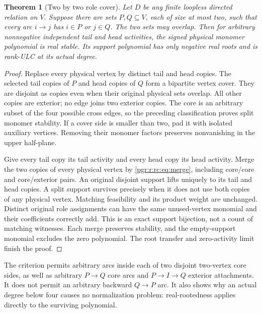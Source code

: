 \documentclass[11pt]{article}
\numberwithin{equation}{section}
\newtheorem{theorem}{Theorem}[section]\newtheorem{lemma}[theorem]{Lemma}\newtheorem{proposition}[theorem]{Proposition}\newtheorem{corollary}[theorem]{Corollary}
\theoremstyle{definition}\newtheorem{definition}[theorem]{Definition}\newtheorem{remark}[theorem]{Remark}
\begin{document}
\begin{theorem}[Two by two role cover]\label{pgr:r:rc:thm:rolecover}
Let $D$ be any finite loopless directed relation on $V$. Suppose there are sets $P,Q\subseteq V$, each of size at most two, such that every arc $i\to j$ has $i\in P$ or $j\in Q$. The two sets may overlap. Then for arbitrary nonnegative independent tail and head activities, the signed physical monomer polynomial is real stable. Its support polynomial has only negative real roots and is rank-ULC at its actual degree.
\end{theorem}
\begin{proof}
Replace every physical vertex by distinct tail and head copies. The selected tail copies of $P$ and head copies of $Q$ form a bipartite vertex cover. They are disjoint as copies even when their original physical sets overlap. All other copies are exterior; no edge joins two exterior copies. The core is an arbitrary subset of the four possible cross edges, so the preceding classification proves split monomer stability. If a cover side is smaller than two, pad it with isolated auxiliary vertices. Removing their monomer factors preserves nonvanishing in the upper half-plane.

Give every tail copy its tail activity and every head copy its head activity. Merge the two copies of every physical vertex by \eqref{pgr:r:rc:eq:merge}, including core/core and core/exterior pairs. An original disjoint support lifts uniquely to its tail and head copies. A split support survives precisely when it does not use both copies of any physical vertex. Matching feasibility and its product weight are unchanged. Distinct original role assignments can have the same unused-vertex monomial and their coefficients correctly add. This is an exact support bijection, not a count of matching witnesses. Each merge preserves stability, and the empty-support monomial excludes the zero polynomial. The root transfer and zero-activity limit finish the proof.
\end{proof}
The criterion permits arbitrary arcs inside each of two disjoint two-vertex core sides, as well as arbitrary $P\to Q$ core arcs and $P\to I\to Q$ exterior attachments. It does not permit an arbitrary backward $Q\to P$ arc. It also shows why an actual degree below four causes no normalization problem: real-rootedness applies directly to the surviving polynomial.
\end{document}
